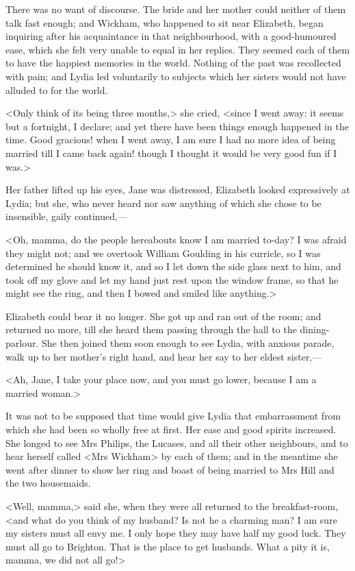 There was no want of discourse. The bride and her mother could neither of them talk fast enough; and Wickham, who happened to sit near Elizabeth, began inquiring after his acquaintance in that neighbourhood, with a good-humoured ease, which she felt very unable to equal in her replies. They seemed each of them to have the happiest memories in the world. Nothing of the past was recollected with pain; and Lydia led voluntarily to subjects which her sisters would not have alluded to for the world.

<Only think of its being three months,> she cried, <since I went away: it seems but a fortnight, I declare; and yet there have been things enough happened in the time. Good gracious! when I went away, I am sure I had no more idea of being married till I came back again! though I thought it would be very good fun if I was.>

Her father lifted up his eyes, Jane was distressed, Elizabeth looked expressively at Lydia; but she, who never heard nor saw anything of which she chose to be insensible, gaily continued,—

<Oh, mamma, do the people hereabouts know I am married to-day? I was afraid they might not; and we overtook William Goulding in his curricle, so I was determined he should know it, and so I let down the side glass next to him, and took off my glove and let my hand just rest upon the window frame, so that he might see the ring, and then I bowed and smiled like anything.>

Elizabeth could bear it no longer. She got up and ran out of the room; and returned no more, till she heard them passing through the hall to the dining-parlour. She then joined them soon enough to see Lydia, with anxious parade, walk up to her mother's right hand, and hear her say to her eldest sister,—

<Ah, Jane, I take your place now, and you must go lower, because I am a married woman.>

It was not to be supposed that time would give Lydia that embarrassment from which she had been so wholly free at first. Her ease and good spirits increased. She longed to see Mrs Philips, the Lucases, and all their other neighbours, and to hear herself called <Mrs Wickham> by each of them; and in the meantime she went after dinner to show her ring and boast of being married to Mrs Hill and the two housemaids.

<Well, mamma,> said she, when they were all returned to the breakfast-room, <and what do you think of my husband? Is not he a charming man? I am sure my sisters must all envy me. I only hope they may have half my good luck. They must all go to Brighton. That is the place to get husbands. What a pity it is, mamma, we did not all go!>

